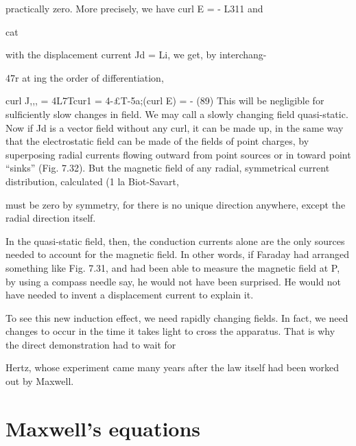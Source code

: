 practically zero. More precisely, we have curl E = - L311 and

cat

with the displacement current Jd = Li, we get, by interchang-

47r at
ing the order of differentiation,

\begin{equation}
\end{equation}
curl J,,, = 4L7Tcur1  = 4-£T-5a;(curl E) = -  (89)
This will be negligible for sulficiently slow changes in field. We
may call a slowly changing field quasi-static. Now if Jd is a vector
field without any curl, it can be made up, in the same way that the
electrostatic field can be made of the fields of point charges, by superposing
radial currents flowing outward from point sources or in
toward point ``sinks'' (Fig. 7.32). But the magnetic field of any
radial, symmetrical current distribution, calculated (1 la Biot-Savart,

must be zero by symmetry, for there is no unique direction anywhere,
except the radial direction itself.

In the quasi-static field, then, the conduction currents alone are
the only sources needed to account for the magnetic field. In other
words, if Faraday had arranged something like Fig. 7.31, and had
been able to measure the magnetic field at P, by using a compass
needle say, he would not have been surprised. He would not have
needed to invent a displacement current to explain it.

To see this new induction effect, we need rapidly changing fields.
In fact, we need changes to occur in the time it takes light to cross
the apparatus. That is why the direct demonstration had to wait for

Hertz, whose experiment came many years after the law itself had
been worked out by Maxwell.

\section{Maxwell's equations}

